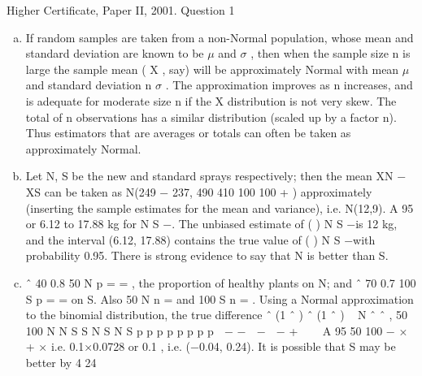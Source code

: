 \documentclass[a4paper,12pt]{article}
\begin{document}
Higher Certificate, Paper II, 2001. Question 1
\begin{enumerate}[(a)]
\item If random samples are taken from a non-Normal population, whose mean and
standard deviation are known to be $\mu$ and $\sigma$ , then when the sample size n is large the
sample mean ( X , say) will be approximately Normal with mean $\mu$  and standard
deviation
n
$\sigma$ . The approximation improves as n increases, and is adequate for
moderate size n if the X distribution is not very skew. The total of n observations has
a similar distribution (scaled up by a factor n). Thus estimators that are averages or
totals can often be taken as approximately Normal.

\item Let N, S be the new and standard sprays respectively; then the mean XN − XS
can be taken as N(249 − 237, 490 410
100 100
+ ) approximately (inserting the sample
estimates for the mean and variance), i.e. N(12,9).
A 95%
or 6.12 to 17.88 kg for N S \mu −\mu .
The unbiased estimate of ( ) N S \mu −\mu is 12 kg, and the interval (6.12, 17.88) contains
the true value of ( ) N S \mu −\mu with probability 0.95. There is strong evidence to say
that N is better than S.
\item  ˆ 40 0.8
50 N p = = , the proportion of healthy plants on N; and ˆ 70 0.7
100 S p = = on
S. Also 50 N n = and 100 S n = . Using a Normal approximation to the binomial
distribution, the true difference ˆ (1 ˆ ) ˆ (1 ˆ )
~ N ˆ ˆ ,
50 100
N N S S
N S N S
p p p p
p p p p
 − − 
−  − + 
 
A 95%
50 100
− \pm  × + ×
i.e. 0.1×0.0728 or 0.1 , i.e. (−0.04, 0.24).
It is possible that S may be better by 4%
24%
\end{enumerate}
\end{document}
